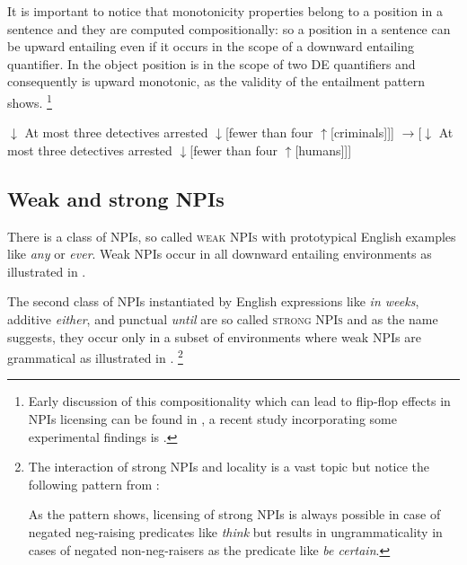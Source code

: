 \documentclass[output=paper,
]{langscibook}
\begin{document}
\noindent It is important to notice that monotonicity properties belong to a position in a sentence and they are computed compositionally: so a position in a sentence can be upward entailing even if it occurs in the scope of a downward entailing quantifier. In  the object position is in the scope of two DE quantifiers and consequently is upward monotonic, as the validity of the entailment pattern shows.%
\footnote{Early discussion of this compositionality which can lead to flip-flop effects in NPIs licensing can be found in \citet{baker1970double}, a recent study incorporating some experimental findings is \citet{geurts2005monotonicity}.}

\ea\label{ex-16} \ea {[}$\downarrow$ At most three detectives arrested
$\downarrow${[}fewer than four $\uparrow${[}criminals{]}{]}{]}
\ex $\rightarrow${[}$\downarrow$ At most three detectives arrested $\downarrow${[}fewer than four $\uparrow${[}humans{]}{]}{]}
\z
\z

\subsection{Weak and strong NPIs}\label{weak-npis}

\noindent There is a class of NPIs, so called \textsc{weak NPIs} with prototypical English examples like  \textit{any} or \textit{ever}. Weak NPIs occur in all downward entailing environments as illustrated in .

\ea\label{ex-17} 
\z
\z

\noindent The second class of NPIs instantiated by English expressions like  \textit{in weeks}, additive \textit{either}, and punctual \textit{until} are so called \textsc{strong NPIs} and as the name suggests, they occur only in a subset of environments where weak NPIs are grammatical as illustrated in .%
\footnote{The interaction of strong NPIs and locality is a vast topic but notice the following pattern from \citet[317]{romoli2013scalar}:

\ea {}
\z
\z

\noindent As the pattern shows, licensing of strong NPIs is always possible in case of negated neg-raising predicates like \textit{think} but results in ungrammaticality in cases of negated non-neg-raisers as the predicate like \textit{be certain}.
}
\end{document}
